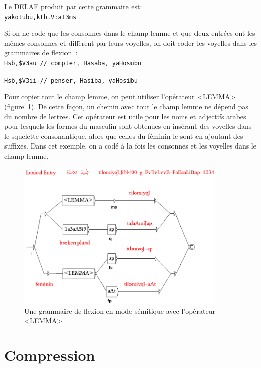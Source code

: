 \bigskip
\noindent Le DELAF produit par cette grammaire est:\\ 
  
\verb+yakotubu,ktb.V:aI3ms+

\bigskip
\noindent Si on ne code que les consonnes dans le champ lemme et que deux entrées ont les mêmes consonnes et diffèrent par leurs voyelles, on doit coder les voyelles dans les grammaires de flexion~:\\ 

\verb+Hsb,$V3au	// compter, Hasaba, yaHosubu+

\verb+Hsb,$V3ii	// penser, Hasiba, yaHosibu+

\bigskip
\noindent Pour copier tout le champ lemme, on peut utiliser l'opérateur <LEMMA> (figure~\ref{LEMMA-operator}). De cette façon, un chemin avec tout le champ lemme ne dépend pas du nombre de lettres.
Cet opérateur est utile pour les noms et adjectifs arabes pour lesquels les formes du masculin sont obtenues en
insérant des voyelles dans le squelette consonantique, alors que celles du féminin le sont en ajoutant des
suffixes. Dans cet exemple, on a codé à la fois les consonnes et les voyelles dans le champ lemme.

\begin{figure}[!ht]
\begin{center}
\includegraphics[width=10cm]{resources/img/fig3-LEMMA-operator.png}
\caption{Une grammaire de flexion en mode sémitique avec l'opérateur <LEMMA>\label{LEMMA-operator}}
\end{center}
\end{figure}

\section{Compression}

